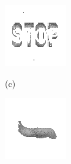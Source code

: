 \documentclass{article}
\begin{document}
\begin{figure}[!b]
\begin{minipage}[c]{.21\linewidth}
  \end{minipage}
  \begin{minipage}[c]{.21\linewidth}
    \centering\centerline{\includegraphics[width=\linewidth]{imgs/dennis_cal/stop/sums/497_994.png}}
  \end{minipage}
  \begin{minipage}[c]{.1\linewidth}
    \centering\centerline{(c)}
  \end{minipage}
  \begin{minipage}[c]{.21\linewidth}
    \centering\centerline{\includegraphics[width=\linewidth]{imgs/dennis_cal/airplane/sums/497_995.png}}

\end{minipage}
\end{figure}
\end{document}
